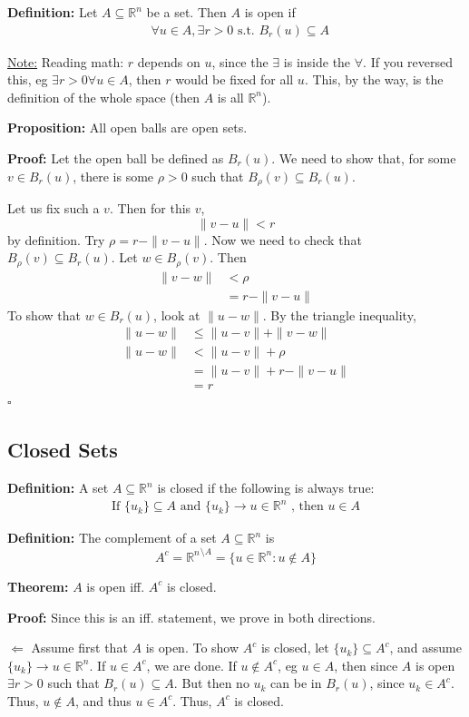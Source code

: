 \documentclass{article}
\newcommand*{\qed}{\hfill$\square$}%
\newcommand*{\txt}[1]{\text{ #1 }}%
\newcommand*{\fora}{\txt{}\forall}%
\newcommand*{\rr}{\mathbb{R}}%
\begin{document}
\textbf{Definition:} Let $A\subseteq \rr^n$ be a set. Then $A$ is open if \begin{align*}
    \fora u\in A, \exists r>0\txt{s.t.}B_r(u)\subseteq A
\end{align*}

\underline{Note:} Reading math: $r$ depends on $u$, since the $\exists$ is inside the $\forall$. If you reversed this, eg $\exists r>0\forall u\in A$, then $r$ would be fixed for all $u$. This, by the way, is the definition of the whole space (then $A$ is all $\rr^n$).

\textbf{Proposition:} All open balls are open sets.

\textbf{Proof:} Let the open ball be defined as $B_r(u)$. We need to show that, for some $v\in B_r(u)$, there is some $\rho>0$ such that $B_\rho(v)\subseteq B_r(u)$.

Let us fix such a $v$. Then for this $v$, \[
    \|v-u\|<r
\]
by definition. Try $\rho=r-\|v-u\|$. Now we need to check that $B_\rho(v)\subseteq B_r(u)$. Let $w\in B_\rho(v)$. Then \begin{align*}
    \|v-w\|&<\rho \\&= r-\|v-u\|
\end{align*}
To show that $w\in B_r(u)$, look at $\|u-w\|$. By the triangle inequality, \begin{align*}
    \|u-w\|&\leq \|u-v\|+\|v-w\| \\\|u-w\|&< \|u-v\|+\rho \\&= \|u-v\|+r-\|v-u\| \\&= r
\end{align*}\qed

\subsection{Closed Sets}
\textbf{Definition:} A set $A\subseteq \rr^n$ is closed if the following is always true: \begin{align*}
    \text{If }\{u_k\}\subseteq A\txt{ and }\{u_k\}\to u\in \rr^n\txt{, then }u\in A
\end{align*}

\textbf{Definition:} The complement of a set $A\subseteq \rr^n$ is \[
    A^c={\rr^n}^{\setminus A}=\{u\in \rr^n:u\notin A\}
\]

\textbf{Theorem:} $A$ is open iff. $A^c$ is closed.

\textbf{Proof:} Since this is an iff. statement, we prove in both directions.

$\Leftarrow$ Assume first that $A$ is open. To show $A^c$ is closed, let $\{u_k\}\subseteq A^c$, and assume $\{u_k\}\to u\in \rr^n$. If $u\in A^c$, we are done. If $u\notin A^c$, eg $u\in A$, then since $A$ is open $\exists r>0$ such that $B_r(u)\subseteq A$. But then no $u_k$ can be in $B_r(u)$, since $u_k\in A^c$. Thus, $u\notin A$, and thus $u\in A^c$. Thus, $A^c$ is closed.
\end{document}
